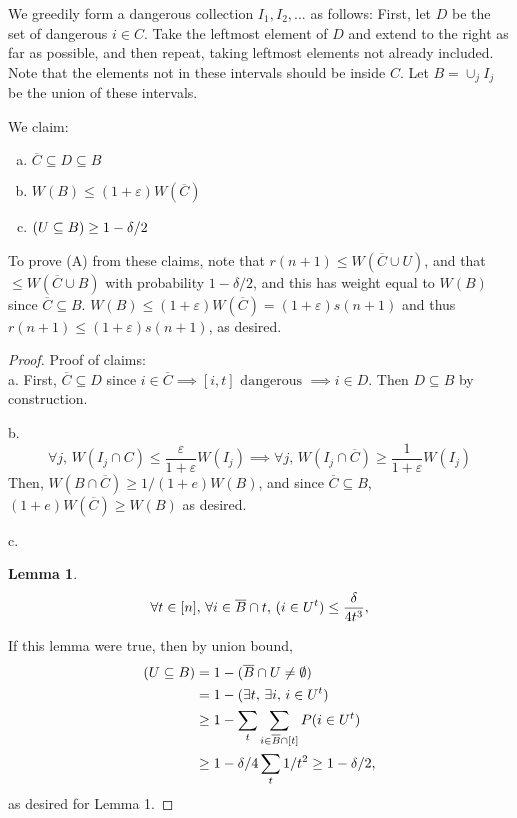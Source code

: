 \documentclass[11pt]{article}
\let\Pr\relax
\DeclareMathOperator*{\Pr}{\mathbb{P}}
\newcommand{\ve}{\varepsilon}
\newtheorem{lemma}[theorem]{Lemma}
\begin{document}
We greedily form a dangerous collection $I_1, I_2, ...$ as follows:
First, let $D$ be the set of dangerous $i \in C$.
Take the leftmost element of $D$ and extend to the right as far as possible,
and then repeat, taking leftmost elements not already included.
Note that the elements not in these intervals should be inside $C$.
Let $B = \cup_j I_j$ be the union of these intervals.

We claim:
\begin{enumerate}[a.]
\item $\overline{C} \subseteq D \subseteq B$
\item $W(B) \leq (1 + \ve)W(\overline{C})$
\item $\Pr(U \subseteq B) \geq 1 - \delta / 2$
\end{enumerate}

To prove (A) from these claims, note that
$r(n+1) \leq W(\overline{C} \cup U)$, and that
  $\leq W(\overline{C} \cup B)$ with probability $1 - \delta / 2$,
  and this has weight equal to $W(B)$ since $\overline{C} \subseteq B$.
  $W(B) \leq (1+\ve)W(\overline{C}) = (1+\ve)s(n+1)$ and thus $r(n+1) \leq
  (1 + \ve) s (n+1)$, as desired.

\begin{proof} Proof of claims:\\
a.
First, $\overline{C} \subseteq D$ since $i \in \overline{C} \implies [i, t]
\text{ dangerous } \implies i \in D$. Then
$D \subseteq B$ by construction.

b.
\[\forall j,\, W(I_j \cap C) \leq \frac{\ve}{1+\ve} W(I_j) \implies
\forall j,\, W(I_j \cap \overline{C}) \geq \frac{1}{1+\ve} W(I_j)\]
Then,
$W(B \cap \overline{C}) \geq 1 / (1+e) W(B)$, and since $\overline{C} \subseteq
B$,
$(1+e) W(\overline{C}) \geq W(B)$ as desired.

c.
\begin{lemma}
\[\forall t \in [n],\, \forall i \in \overline{B} \cap t,\, \Pr(i \in U^t) \leq
\frac{\delta}{4t^3},\]
\end{lemma}
If this lemma were true, then by union bound,
\begin{align*}
\Pr(U \subseteq B) &= 1 - \Pr(\overline{B} \cap U \neq \emptyset) \\
&= 1 - \Pr(\exists t,\, \exists i,\, i \in U^t) \\
&\geq 1 - \sum_t \sum_{i\in \overline{B} \cap [t]} P(i \in U^t) \\
&\geq 1 - \delta / 4 \sum_t 1/t^2 \geq 1 - \delta / 2,
\end{align*}
as desired for Lemma 1.
\end{proof}
\end{document}
